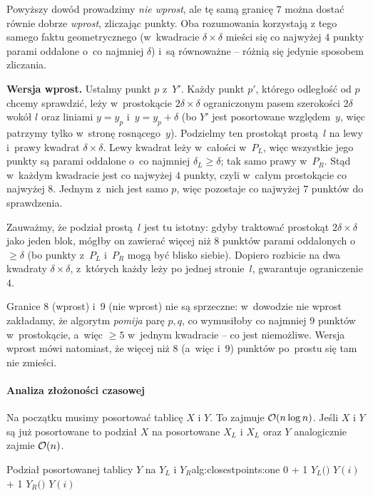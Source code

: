 \begin{dygresja}
	Powyższy dowód prowadzimy \emph{nie wprost}, ale tę samą granicę $7$ można dostać równie dobrze \emph{wprost}, zliczając punkty. Oba rozumowania korzystają z tego samego faktu geometrycznego (w~kwadracie $\delta\times\delta$ mieści się co najwyżej $4$ punkty parami oddalone o~co najmniej $\delta$) i~są równoważne -- różnią się jedynie sposobem zliczania.

	\textbf{Wersja wprost.} Ustalmy punkt $p$ z~$Y'$. Każdy punkt $p'$, którego odległość od $p$ chcemy sprawdzić, leży w~prostokącie $2\delta\times\delta$ ograniczonym pasem szerokości $2\delta$ wokół $l$ oraz liniami $y = y_p$ i~$y = y_p + \delta$ (bo $Y'$ jest posortowane względem~$y$, więc patrzymy tylko w~stronę rosnącego~$y$). Podzielmy ten prostokąt prostą~$l$ na lewy i~prawy kwadrat $\delta\times\delta$. Lewy kwadrat leży w~całości w~$P_L$, więc wszystkie jego punkty są parami oddalone o~co najmniej $\delta_L \geq \delta$; tak samo prawy w~$P_R$. Stąd w~każdym kwadracie jest co najwyżej $4$ punkty, czyli w~całym prostokącie co najwyżej $8$. Jednym z~nich jest samo $p$, więc pozostaje co najwyżej $7$ punktów do sprawdzenia.

	Zauważmy, że podział prostą~$l$ jest tu istotny: gdyby traktować prostokąt $2\delta\times\delta$ jako jeden blok, mógłby on zawierać więcej niż $8$ punktów parami oddalonych o~$\geq\delta$ (bo punkty z~$P_L$ i~$P_R$ mogą być blisko siebie). Dopiero rozbicie na dwa kwadraty $\delta\times\delta$, z~których każdy leży po jednej stronie~$l$, gwarantuje ograniczenie $4$.

	Granice $8$ (wprost) i~$9$ (nie wprost) nie są sprzeczne: w~dowodzie nie wprost zakładamy, że algorytm \emph{pomija} parę $p,q$, co wymusiłoby co najmniej $9$ punktów w~prostokącie, a~więc $\geq 5$ w~jednym kwadracie -- co jest niemożliwe. Wersja wprost mówi natomiast, że więcej niż $8$ (a~więc i~$9$) punktów po~prostu się tam nie zmieści.
\end{dygresja}

\paragraph{Analiza złożoności czasowej}
Na początku musimy posortować tablicę $X$ i $Y$. To zajmuje $\mathcal{O}(n\log n)$. Jeśli $X$ i $Y$ są już posortowane
to podział $X$ na posortowane $X_L$ i $X_L$ oraz $Y$ analogicznie zajmie $\mathcal{O}(n)$.

\begin{alg}{Podział posortowanej tablicy $Y$ na $Y_L$ i $Y_R$}{alg:closestpoints:one}
	\State {} \Assign {} \Assign $0$
	\State {} \Assign {} + 1
	\State $Y_L($$)$ \Assign $Y(i)$
	\Else
	\State {} \Assign {} + 1
	\State $Y_R($$)$ \Assign $Y(i)$
	\EndIf
	\EndFor
\end{alg}

